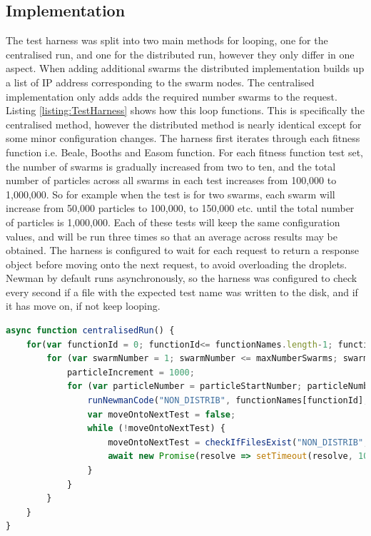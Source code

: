 \documentclass[oneside,12pt]{book}
\begin{document}
\subsection{Implementation}
The test harness was split into two main methods for looping, one for the centralised run, and one for the distributed run, however they only differ in one aspect. When adding additional swarms the distributed implementation builds up a list of IP address corresponding to the swarm nodes. The centralised implementation only adds adds the required number swarms to the request. Listing \ref{listing:TestHarness} shows how this loop functions. This is specifically the centralised method, however the distributed method is nearly identical except for some minor configuration changes. The harness first iterates through each fitness function i.e. Beale, Booths and Easom function. For each fitness function test set, the number of swarms is gradually increased from two to ten, and the total number of particles across all swarms in each test increases from 100,000 to 1,000,000. So for example when the test is for two swarms, each swarm will increase from 50,000 particles to 100,000, to 150,000 etc. until the total number of particles is 1,000,000. Each of these tests will keep the same configuration values, and will be run three times so that an average across results may be obtained. The harness is configured to wait for each request to return a response object before moving onto the next request, to avoid overloading the droplets. Newman by default runs asynchronously, so the harness was configured to check every second if a file with the expected test name was written to the disk, and if it has move on, if not keep looping. 

\begin{lstlisting}[basicstyle=\footnotesize, language=JavaScript]
async function centralisedRun() {
    for(var functionId = 0; functionId<= functionNames.length-1; functionId ++) {
        for (var swarmNumber = 1; swarmNumber <= maxNumberSwarms; swarmNumber++) {
            particleIncrement = 1000;
            for (var particleNumber = particleStartNumber; particleNumber <= maxNumberParticles; particleNumber += particleIncrement) {
                runNewmanCode("NON_DISTRIB", functionNames[functionId], "Remote", swarmNumber, particleNumber, baseUrlStringsNonDistributed, nonDistribEndpoint);
                var moveOntoNextTest = false;
                while (!moveOntoNextTest) {
                    moveOntoNextTest = checkIfFilesExist("NON_DISTRIB", functionNames[functionId], swarmNumber, particleNumber);
                    await new Promise(resolve => setTimeout(resolve, 1000));
                }
            }
        }
    }
}
\end{lstlisting}
\label{listing:TestHarness}
\end{document}
